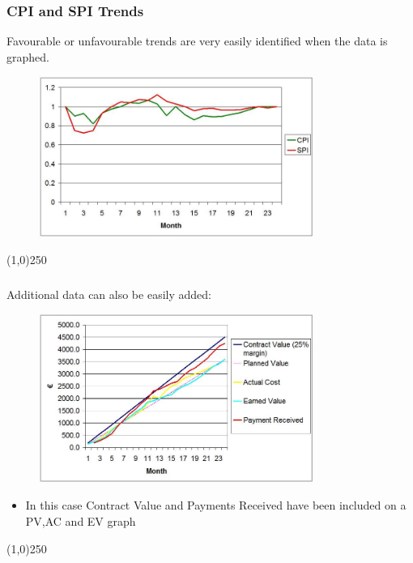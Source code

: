 \begin{frame}
\frametitle{CPI and SPI Trends}
Favourable or unfavourable trends are very easily identified when the data is graphed.\\
\begin{figure}
	\centering
		\includegraphics[width = 9cm]{images/cpitrend.jpg}
	\label{fig:cpitrend}
\end{figure}

\end{frame}
\begin{center}\line(1,0){250}\end{center}





\begin{frame}
\frametitle{}
Additional data can also be easily added:
\begin{figure}
	\centering
		\includegraphics[width = 9cm]{images/alltrends.jpg}
	\label{fig:alltrends}
\end{figure}
\begin{itemize}
	\item In this case Contract Value and Payments Received have been included on a PV,AC and EV graph
\end{itemize}
\end{frame}
\begin{center}\line(1,0){250}\end{center}





